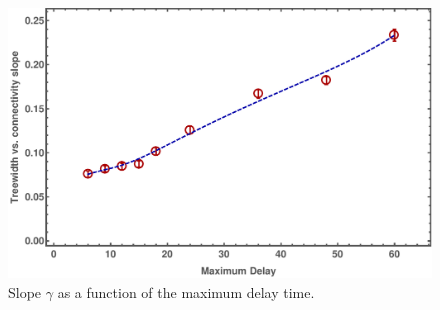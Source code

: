 \begin{figure}
\includegraphics[width=\columnwidth]{pics/instances/treewidth_pl.pdf}
\caption[Treewidth-size correlation coefficient vs. $d_{\max}$]{Slope $\gamma$ as a function
  of the maximum delay time.}
\label{fig:treewidth-size-correlation}
\end{figure}
